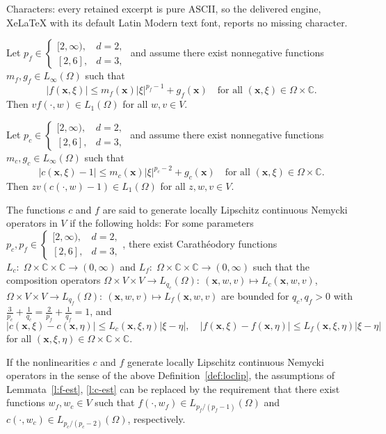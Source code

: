 \documentclass[10pt,a4paper]{amsart}
\providecommand{\C}{\mathbb{C}}
\providecommand{\Om}{\Omega}
\providecommand{\vecx}{\boldsymbol{x}}
\begin{document}
Characters: every retained excerpt is pure ASCII, so the delivered engine, XeLaTeX with its default Latin Modern text font, reports no missing character.
\begin{lemma}\label{l:f-est}
Let $p_f\in\begin{cases}
[2,\infty), & d=2,\\
[2,6], & d=3,
\end{cases}$
and assume there exist nonnegative functions $m_f,g_f\in L_\infty(\Om)$
such that
\[
|f(\vecx,\xi)|\le m_f(\vecx)|\xi|^{p_f-1} + g_f(\vecx)
\quad\text{for all }
(\vecx,\xi)\in \Om\times\C.
\]
Then $vf(\cdot,w) \in L_1(\Om)$ for all $w,v\in V$.
\end{lemma}

\begin{lemma}\label{l:c-est}
Let $p_c\in\begin{cases}
[2,\infty), & d=2,\\
[2,6], & d=3,
\end{cases}$
and assume there exist nonnegative functions $m_c,g_c\in L_\infty(\Om)$
such that
\[
|c(\vecx,\xi)-1|\le m_c(\vecx)|\xi|^{p_c-2} + g_c(\vecx)
\quad\text{for all }
(\vecx,\xi)\in \Om\times\C.
\]
Then $zv(c(\cdot,w)-1)\in L_1(\Om)$ for all $z,w,v\in V$.
\end{lemma}

\begin{definition}\label{def:loclip}
The functions $c$ and $f$ are said to generate locally Lipschitz continuous
Nemycki operators in $V$ if the following holds: For some parameters
$p_c,p_f\in\begin{cases}
[2,\infty), & d=2,\\
[2,6], & d=3,
\end{cases}$,
there exist Carath\'{e}odory functions
$L_c:\;\Om\times\C\times\C\to(0,\infty)$ and $L_f:\;\Om\times\C\times\C\to(0,\infty)$
such that the composition operators
$\Om\times V\times V\to L_{q_c}(\Om):\:(\vecx,w,v)\mapsto L_c(\vecx,w,v)$,
$\Om\times V\times V\to L_{q_f}(\Om):\:(\vecx,w,v)\mapsto L_f(\vecx,w,v)$
are bounded for $q_c,q_f>0$ with
$\frac{3}{p_c}+\frac{1}{q_c}=\frac{2}{p_f}+\frac{1}{q_f}=1$,
and
\[
|c(\vecx,\xi)-c(\vecx,\eta)| \le L_c(\vecx,\xi,\eta) |\xi-\eta|,
\quad
|f(\vecx,\xi)-f(\vecx,\eta)| \le L_f(\vecx,\xi,\eta) |\xi-\eta|
\]
for all $(\vecx,\xi,\eta)\in\Om\times\C\times\C$.
\end{definition}

\begin{remark}\label{rem:df-est}
If the nonlinearities $c$ and $f$ generate locally Lipschitz continuous
Nemycki operators in the sense of the above Definition~\ref{def:loclip}, the
assumptions of Lemmata~\ref{l:f-est}, \ref{l:c-est} can be replaced by
the requirement that there exist functions $w_f,w_c\in V$ such that
$f(\cdot,w_f)\in L_{p_f/(p_f-1)}(\Om)$ and $c(\cdot,w_c)\in L_{p_c/(p_c-2)}(\Om)$,
respectively.
\end{remark}
\end{document}
